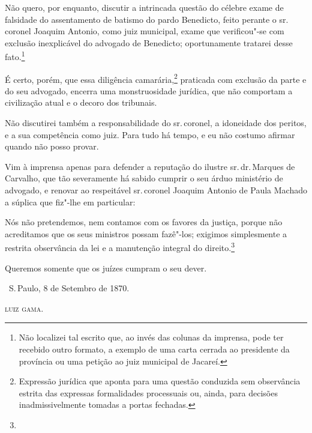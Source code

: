 Não quero, por enquanto, discutir a intrincada questão do célebre exame
de falsidade do assentamento de batismo do pardo Benedicto, feito
perante o sr.\,coronel Joaquim Antonio, como juiz municipal, exame que
verificou"-se com exclusão inexplicável do advogado de Benedicto;
oportunamente tratarei desse fato.\footnote{Não localizei tal escrito
  que, ao invés das colunas da imprensa, pode ter recebido outro
  formato, a exemplo de uma carta cerrada ao presidente da província ou
  uma petição ao juiz municipal de Jacareí.}

É certo, porém, que essa diligência camarária,\footnote{Expressão
  jurídica que aponta para uma questão conduzida sem observância estrita
  das expressas formalidades processuais ou, ainda, para decisões
  inadmissivelmente tomadas a portas fechadas.} praticada com exclusão
da parte e do seu advogado, encerra uma monstruosidade jurídica, que não
comportam a civilização atual e o decoro dos tribunais.

Não discutirei também a responsabilidade do sr.\,coronel, a idoneidade
dos peritos, e a sua competência como juiz. Para tudo há tempo, e eu não
costumo afirmar quando não posso provar.

Vim à imprensa apenas para defender a reputação do ilustre sr.\,dr.\,Marques de Carvalho, que tão severamente há sabido cumprir o seu árduo
ministério de advogado, e renovar ao respeitável sr.\,coronel Joaquim
Antonio de Paula Machado a súplica que fiz"-lhe em particular:

Nós não pretendemos, nem contamos com os favores da justiça, porque não
acreditamos que os seus ministros possam fazê"-los; exigimos simplesmente
a restrita observância da lei e a manutenção integral do
direito.\footnote{}

Queremos somente que os juízes cumpram o seu dever.

\vfill

\hfill\ S.\,Paulo, 8 de Setembro de 1870.\smallskip

\hfill\textsc{luiz gama.}

